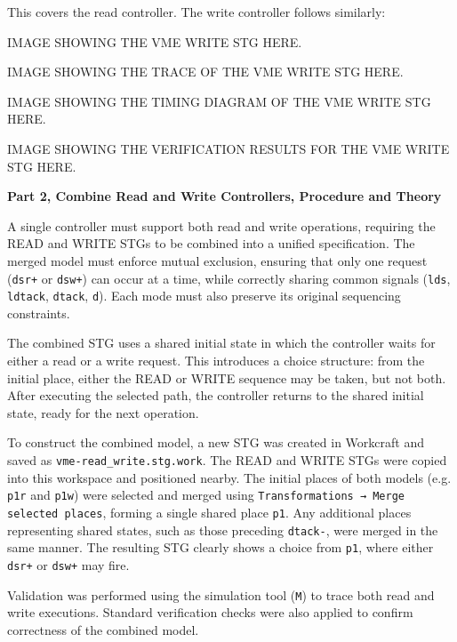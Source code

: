 \documentclass[a4paper,12pt]{article}
\begin{document}
This covers the read controller. The write controller follows similarly:

\begin{large}
    IMAGE SHOWING THE VME WRITE STG HERE.
\end{large}

\begin{large}
    IMAGE SHOWING THE TRACE OF THE VME WRITE STG HERE.
\end{large}

\begin{large}
    IMAGE SHOWING THE TIMING DIAGRAM OF THE VME WRITE STG HERE.
\end{large}

\begin{large}
    IMAGE SHOWING THE VERIFICATION RESULTS FOR THE VME WRITE STG HERE.
\end{large}

\textbf{Part 2, Combine Read and Write Controllers, Procedure and Theory}

A single controller must support both read and write operations, requiring the READ and WRITE STGs to be combined into a unified specification. The merged model must enforce mutual exclusion, ensuring that only one request (\texttt{dsr+} or \texttt{dsw+}) can occur at a time, while correctly sharing common signals (\texttt{lds}, \texttt{ldtack}, \texttt{dtack}, \texttt{d}). Each mode must also preserve its original sequencing constraints.

The combined STG uses a shared initial state in which the controller waits for either a read or a write request. This introduces a choice structure: from the initial place, either the READ or WRITE sequence may be taken, but not both. After executing the selected path, the controller returns to the shared initial state, ready for the next operation.

To construct the combined model, a new STG was created in Workcraft and saved as \texttt{vme-read\_write.stg.work}. The READ and WRITE STGs were copied into this workspace and positioned nearby. The initial places of both models (e.g. \texttt{p1r} and \texttt{p1w}) were selected and merged using \texttt{Transformations → Merge selected places}, forming a single shared place \texttt{p1}. Any additional places representing shared states, such as those preceding \texttt{dtack-}, were merged in the same manner. The resulting STG clearly shows a choice from \texttt{p1}, where either \texttt{dsr+} or \texttt{dsw+} may fire.

Validation was performed using the simulation tool (\texttt{M}) to trace both read and write executions. Standard verification checks were also applied to confirm correctness of the combined model.
\end{document}
